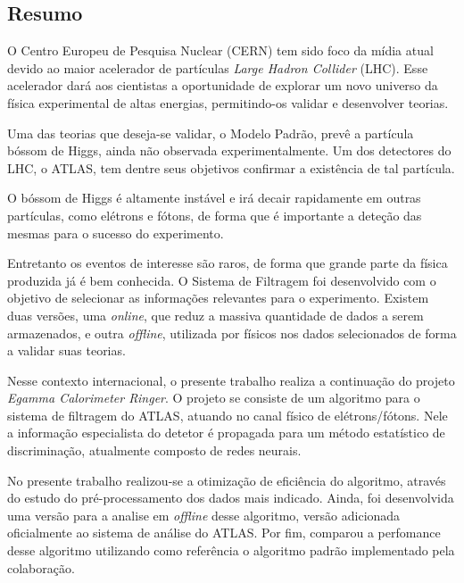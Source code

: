 \vfill
\begin{center}
\section*{Resumo\label{Resumo}}
\end{center}

O Centro Europeu de Pesquisa Nuclear (CERN) tem sido foco da mídia atual devido
ao maior acelerador de partículas \emph{Large Hadron Collider} (LHC). Esse
acelerador dará aos cientistas a oportunidade de explorar um novo universo da física
experimental de altas energias, permitindo-os validar e desenvolver teorias.

Uma das teorias que deseja-se validar, o Modelo Padrão, prevê a partícula bóssom
de Higgs, ainda não observada experimentalmente. Um dos detectores do LHC, o
ATLAS, tem dentre seus objetivos confirmar a existência de tal partícula.

O bóssom de Higgs é altamente instável e irá decair rapidamente em outras
partículas, como elétrons e fótons, de forma que é importante a deteção das
mesmas para o sucesso do experimento.

Entretanto os eventos de interesse são raros, de forma que grande parte da
física produzida já é bem conhecida. O Sistema de Filtragem foi desenvolvido
com o objetivo de selecionar as informações relevantes para o experimento.
Existem duas versões, uma \emph{online}, que reduz a massiva quantidade de dados
a serem armazenados, e outra \emph{offline}, utilizada por físicos nos dados
selecionados de forma a validar suas teorias.

Nesse contexto internacional, o presente trabalho realiza a continuação
do projeto \emph{Egamma Calorimeter Ringer}. O projeto se consiste de um algoritmo 
para o sistema de filtragem do ATLAS, atuando no canal físico de
elétrons/fótons. Nele a informação especialista do detetor é propagada para um
método estatístico de discriminação, atualmente composto de redes neurais.

No presente trabalho realizou-se a otimização de eficiência do algoritmo, 
através do estudo do pré-processamento dos dados mais indicado. 
Ainda, foi desenvolvida uma versão para a analise em 
\emph{offline} desse algoritmo, versão adicionada oficialmente ao
sistema de análise do ATLAS. Por fim, comparou a perfomance desse algoritmo 
utilizando como referência o algoritmo padrão implementado pela colaboração.

\paragraph{}

